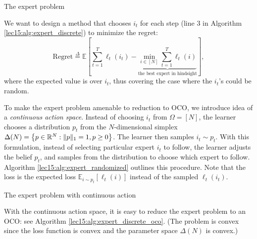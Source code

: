 \begin{algorithm}[h]
\caption{The expert problem}
\label{lec15:alg:expert_discrete}
\end{algorithm}

We want to design a method that chooses $i_t$ for each step (line 3 in Algorithm \ref{lec15:alg:expert_discrete}) to minimize the regret:
\begin{equation}
\text{Regret} \overset{\Delta}{=} \mathbb{E}\left[
\sum_{t=1}^T \ell_t(i_t)
- \underbrace{\min_{i \in [N]} \sum_{t=1}^T \ell_t(i)}_\text{the best expert in hindsight}
\right],
\end{equation}
where the expected value is over $i_t$, thus covering the case where the $i_t$'s could be random.
    
To make the expert problem amenable to reduction to OCO, we introduce idea of a \textit{continuous action space}. Instead of choosing $i_t$ from $\Omega = [N]$, the learner chooses a distribution $p_t$ from the $N$-dimensional simplex $\Delta(N) = \left\{p \in \mathbb R^N : \|p\|_1 = 1, p \geq 0 \right\}$. The learner then samples $i_t \sim p_t$. With this formulation, instead of selecting particular expert $i_t$ to follow, the learner adjusts the belief $p_t$, and samples from the distribution to choose which expert to follow. Algorithm \ref{lec15:alg:expert_randomized} outlines this procedure. Note that the loss is the expected loss $\mathbb{E}_{i \sim p_t}[\ell_t(i)]$ instead of the sampled $\ell_t(i_t)$.

\begin{algorithm}
\caption{The expert problem with continuous action}
\label{lec15:alg:expert_randomized}
\end{algorithm}
    
With the continuous action space, it is easy to reduce the expert problem to an OCO: see Algorithm \ref{lec15:alg:expert_discrete_oco}. (The problem is convex since the loss function is convex and the parameter space $\Delta(N)$ is convex.)

